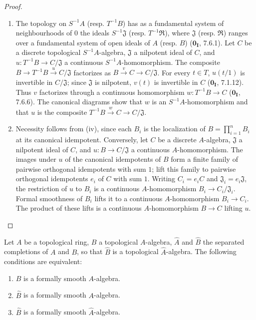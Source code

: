 \begin{proof}
\begin{enumerate}
  \item[(iv)] The topology on $S^{-1}A$ (resp. $T^{-1}B$) has as a fundamental
  system of neighbourhoods of $0$ the ideals $S^{-1}\mathfrak{J}$ (resp.
  $T^{-1}\mathfrak{R}$), where $\mathfrak{J}$ (resp. $\mathfrak{R}$) ranges
  over a fundamental system of open ideals of $A$ (resp. $B$)
  ($\mathbf{0_I}$, 7.6.1). Let $C$ be a discrete topological
  $S^{-1}A$-algebra, $\mathfrak{J}$ a nilpotent ideal of $C$, and
  $u:T^{-1}B\to C/\mathfrak{J}$ a continuous $S^{-1}A$-homomorphism. The
  composite $B\to T^{-1}B\xrightarrow{u}C/\mathfrak{J}$ factorizes as
  $B\xrightarrow{v}C\to C/\mathfrak{J}$. For every $t\in T$, $u(t/1)$ is
  invertible in $C/\mathfrak{J}$; since $\mathfrak{J}$ is nilpotent, $v(t)$ is
  invertible in $C$ ($\mathbf{0_I}$, 7.1.12). Thus $v$ factorizes through a
  continuous homomorphism $w:T^{-1}B\to C$ ($\mathbf{0_I}$, 7.6.6). The
  canonical diagrams show that $w$ is an $S^{-1}A$-homomorphism and that
  $u$ is the composite $T^{-1}B\xrightarrow{w}C\to C/\mathfrak{J}$.

  \item[(v)] Necessity follows from (iv), since each $B_i$ is the localization of
  $B=\prod_{i=1}^n B_i$ at its canonical idempotent. Conversely, let $C$ be a
  discrete $A$-algebra, $\mathfrak{J}$ a nilpotent ideal of $C$, and
  $u:B\to C/\mathfrak{J}$ a continuous $A$-homomorphism. The images under $u$
  of the canonical idempotents of $B$ form a finite family of pairwise
  orthogonal idempotents with sum $1$; lift this family to pairwise orthogonal
  idempotents $e_i$ of $C$ with sum $1$. Writing $C_i=e_iC$ and
  $\mathfrak{J}_i=e_i\mathfrak{J}$, the restriction of $u$ to $B_i$ is a
  continuous $A$-homomorphism $B_i\to C_i/\mathfrak{J}_i$. Formal smoothness of
  $B_i$ lifts it to a continuous $A$-homomorphism $B_i\to C_i$. The product of
  these lifts is a continuous $A$-homomorphism $B\to C$ lifting $u$.
\end{enumerate}
\end{proof}


\begin{proposition}[19.3.6]
\label{0.19.3.6}
Let $A$ be a topological ring, $B$ a topological $A$-algebra, $\widehat{A}$ and $\widehat{B}$ the separated completions of $A$ and $B$, so that $\widehat{B}$ is a topological $\widehat{A}$-algebra.
The following conditions are equivalent:
\begin{enumerate}
  \item[a)] $B$ is a formally smooth $A$-algebra.
  \item[b)] $\widehat{B}$ is a formally smooth $A$-algebra.
  \item[c)] $\widehat{B}$ is a formally smooth $\widehat{A}$-algebra.
\end{enumerate}
\end{proposition}

